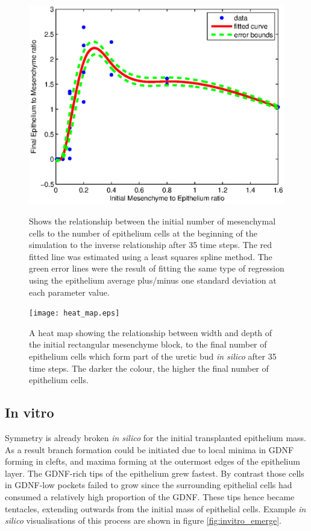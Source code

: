 \documentclass[pdftex,10pt,a4paper,twocolumn]{article}
\begin{document}
\begin{figure}[t] 
\centering
\scalebox{1.0} 
{\includegraphics{cell_numbers_increment.eps}}
\caption{Shows the relationship between the initial number of mesenchymal cells to the number of epithelium cells at the beginning of the simulation to the inverse relationship after 35 time steps. The red fitted line was estimated using a least squares spline method. The green error lines were the result of fitting the same type of regression using the epithelium average plus/minus one standard deviation at each parameter value.}\label{fig:nums_increment}
\end{figure}

\begin{figure}[t] 
\centering
\scalebox{0.8} 
{\texttt{[image: heat\_map.eps]}}
\caption{A heat map showing the relationship between width and depth of the initial rectangular mesenchyme block, to the final number of epithelium cells which form part of the uretic bud \textit{in silico} after 35 time steps. The darker the colour, the higher the final number of epithelium cells.}\label{fig:heat}
\end{figure}  

\subsection{In vitro}
Symmetry is already broken \textit{in silico} for the initial transplanted epithelium mass. As a result branch formation could be initiated due to local minima in GDNF forming in clefts, and maxima forming at the outermost edges of the epithelium layer. The GDNF-rich tips of the epithelium grew fastest. By contrast those cells in GDNF-low pockets failed to grow since the surrounding epithelial cells had consumed a relatively high proportion of the GDNF. These tips hence became tentacles, extending outwards from the initial mass of epithelial cells. Example \textit{in silico} visualisations of this process are shown in figure \ref{fig:invitro_emerge}.
\end{document}
